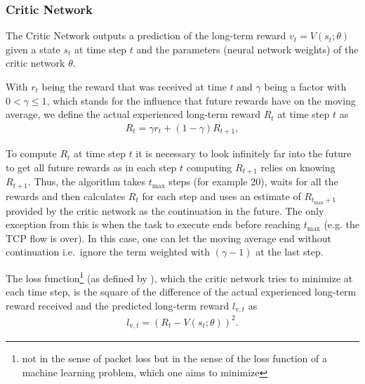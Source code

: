 \documentclass[10pt,sigconf,anonymous]{acmart}
\newcommand\note[2]{{\color{#1}#2}}
\newcommand\todo[1]{{\note{red}{TODO: #1}}}
\begin{document}
\subsubsection{Critic Network}
\label{subsubsec:genericvalue}

The Critic Network outputs a prediction of the long-term reward $v_t = V(s_{t}; \theta)$ given a state $s_t$ at time step $t$ and the parameters (neural network weights) of the critic network $\theta$.

With $r_t$ being the reward that was received at time $t$ and $\gamma$ being a factor with $0 < \gamma \leq 1$, which stands for the influence that future rewards have on the moving average, we define the actual experienced long-term reward $R_t$ at time step $t$ as 
\begin{align}
R_t = \gamma r_{t} + (1-\gamma) R_{t+1} ,
\end{align}

To compute $R_t$ at time step $t$ it is necessary to look infinitely far into the future to get all future rewards as in each step $t$ computing $R_{t+1}$ relies on knowing $R_{t+1}$. Thus, the algorithm takes $t_\text{max}$ steps (for example 20), waits for all the rewards and then calculates $R_t$ for each step and uses an estimate of $R_{t_\text{max}+1}$ provided by the critic network as the continuation in the future. The only exception from this is when the task to execute ends before reaching $t_\text{max}$ (e.g. the TCP flow is over). In this case, one can let the moving average end without continuation i.e.~ignore the term weighted with $(\gamma-1)$ at the last step. 



The loss function\footnote{not in the sense of packet loss but in the sense of the loss function of a machine learning problem, which one aims to minimize} (as defined by \cite{mnih_asynchronous_2016}), which the critic network tries to minimize at each time step, is the square of the difference of the actual experienced long-term reward received and the predicted long-term reward $l_{\text{v},t}$ as
\begin{align}
l_{\text{v},t} = \left(R_t - V(s_t; \theta)\right)^2.
\end{align}
\end{document}
